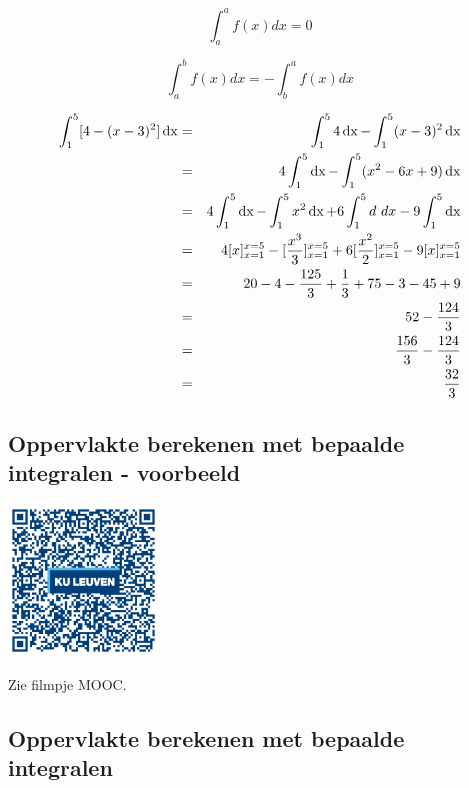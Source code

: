 \begin{rekenregel}
	\[\int^a_a f(x) dx = 0\]

\[\int^b_a f(x) dx = - \int^a_b f(x) dx\]
\end{rekenregel}

\begin{voorbeeld}
	\begin{eqnarray*}
	\int_{1}^{5} [4-(x-3)^2] \operatorname{dx} &=& \int_{1}^{5} 4 \operatorname{dx} - \int_{1}^{5} (x-3)^2 \operatorname{dx} \\
	&=& 4 \int_{1}^{5} \operatorname{dx} - \int_{1}^{5} (x^2-6x+9) \operatorname{dx} \\
	&=& 4 \int_{1}^{5} \operatorname{dx} - \int_{1}^{5} x^2 \operatorname{dx} +6 \int_{1}^{5} d\ dx - 9 \int_{1}^{5} \operatorname{dx} \\
	&=& 4[x]_{x=1}^{x=5}-[\frac{x^3}{3}]_{x=1}^{x=5}+6[\frac{x^2}{2}]_{x=1}^{x=5}-9[x]_{x=1}^{x=5} \\
	&=& 20-4-\frac{125}{3}+\frac{1}{3}+75-3-45+9 \\
	&=& 52 - \frac{124}{3} \\
	&=& \frac{156}{3} - \frac{124}{3} \\
	&=& \frac{32}{3} \\
	\end{eqnarray*}
\end{voorbeeld}


\subsection{Oppervlakte berekenen met bepaalde integralen - voorbeeld}
\begin{minipage}{.25\linewidth}
	\raggedright
	\includegraphics[width=4cm]{6_afgeleiden_integralen/inputs/QR_Code_OPPBEPINT_module6_2new}
\end{minipage}
\begin{minipage}{.7\linewidth}
	Zie filmpje MOOC.
\end{minipage}


\subsection{Oppervlakte berekenen met bepaalde integralen}

